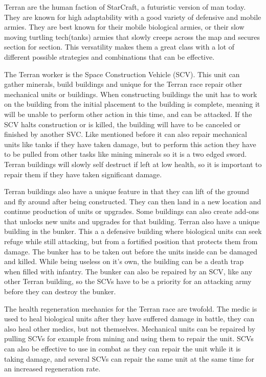 Terran are the human faction of StarCraft, a futuristic version of man today.
They are known for high adaptability with a good variety of defensive and mobile
armies. They are best known for their mobile biological armies, or their slow
moving turtling tech(tanks) armies that slowly creeps across the map and secures
section for section. This versatility makes them a great class with a lot of
different possible strategies and combinations that can be effective.
 
The Terran worker is the Space Construction Vehicle (SCV). This unit can gather
minerals, build buildings and unique for the Terran race repair other mechanical
units or buildings. When constructing buildings the unit has to work on the
building from the initial placement to the building is complete, meaning it will
be unable to perform other action in this time, and can be attacked. If the SCV
halts construction or is killed, the building will have to be canceled or
finished by another SVC. Like mentioned before it can also repair mechanical
units like tanks if they have taken damage, but to perform this action they have
to be pulled from other tasks like mining minerals so it is a two edged sword.
Terran buildings will slowly self destruct if left at low health, so it is
important to repair them if they have taken significant damage.
 
Terran buildings also have a unique feature in that they can lift of the ground
and fly around after being constructed. They can then land in a new location and
continue production of units or upgrades. Some buildings can also create add-ons
that unlocks new units and upgrades for that building. Terran also have a unique
building in the bunker. This a a defensive building where  biological units can
seek refuge while still attacking, but from a fortified position that protects
them from damage. The bunker has to be taken out before the units inside can be
damaged and killed. While being useless on it's own, the building can be a death
trap when filled with infantry. The bunker can also be repaired by an SCV, like
any other Terran building, so the SCVs have to be a priority for an attacking
army before they can destroy the bunker.
 
The health regeneration mechanics for the Terran race are twofold. The medic is
used to heal biological units after they have suffered damage in battle, they
can also heal other medics, but not themselves. Mechanical units can be
repaired by pulling SCVs for example from mining and using them to repair the
unit. SCVs can also be effective to use in combat as they can repair the unit
while it is taking damage, and several SCVs can repair the same unit at the same
time for an increased regeneration rate.
 
